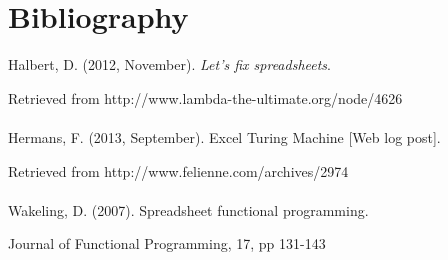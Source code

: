 \documentclass[10pt,a4paper]{article}
\begin{document}
\section*{Bibliography}
Halbert, D. (2012, November). \textit{Let's fix spreadsheets}.

Retrieved from http://www.lambda-the-ultimate.org/node/4626
\\\\
Hermans, F. (2013, September). Excel Turing Machine [Web log post].

Retrieved from http://www.felienne.com/archives/2974
\\\\
Wakeling, D. (2007). Spreadsheet functional programming.

Journal of Functional Programming, 17, pp 131-143
\end{document}
